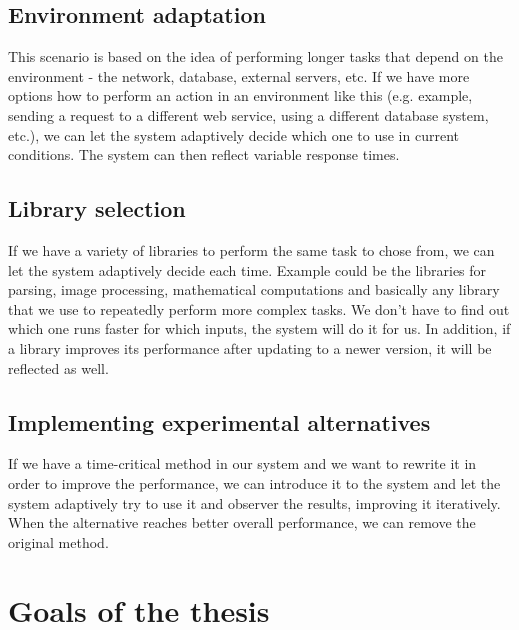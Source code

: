 \subsection{Environment adaptation}

This scenario is based on the idea of performing longer tasks that depend on the environment - the network, database, external servers, etc. If we have more options how to perform an action in an environment like this (e.g. example, sending a request to a different web service, using a different database system, etc.), we can let the system adaptively decide which one to use in current conditions. The system can then reflect variable response times.

\subsection{Library selection}

If we have a variety of libraries to perform the same task to chose from, we can let the system adaptively decide each time. Example could be the libraries for parsing, image processing, mathematical computations and basically any library that we use to repeatedly perform more complex tasks. We don't have to find out which one runs faster for which inputs, the system will do it for us. In addition, if a library improves its performance after updating to a newer version, it will be reflected as well.

\subsection{Implementing experimental alternatives}

If we have a time-critical method in our system and we want to rewrite it in order to improve the performance, we can introduce it to the system and let the system adaptively try to use it and observer the results, improving it iteratively. When the alternative reaches better overall performance, we can remove the original method.

\section{Goals of the thesis}


